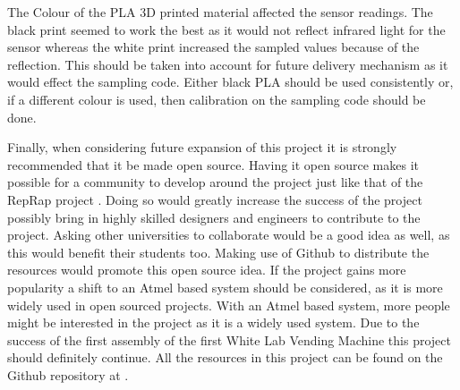 \documentclass[a4paper,11pt]{article}
\numberwithin{figure}{section}
\numberwithin{table}{section}
\begin{document}
The Colour of the PLA 3D printed material affected the sensor readings. The black print seemed to work the best as it would not reflect infrared light for the sensor whereas the white print increased the sampled values because of the reflection. This should be taken into account for future delivery mechanism as it would effect the sampling code. Either black PLA should be used consistently or, if a different colour is used, then calibration on the sampling code should be done.

Finally, when considering future expansion of this project it is strongly recommended that it be made open source. Having it open source makes it possible for a community to develop around the project just like that of the RepRap project \cite{reprap}. Doing so would greatly increase the success of the project possibly bring in highly skilled designers and engineers to contribute to the project. Asking other universities to collaborate would be a good idea as well, as this would benefit their students too. Making use of Github to distribute the resources would promote this open source idea. If the project gains more popularity a shift to an Atmel based system should be considered, as it is more widely used in open sourced projects. With an Atmel based system, more people might be interested in the project as it is a widely used system. Due to the success of the first assembly of the first White Lab Vending Machine this project should definitely continue. All the resources in this project can be found on the Github repository at \cite{github}.
\newpage




\newpage
\end{document}
